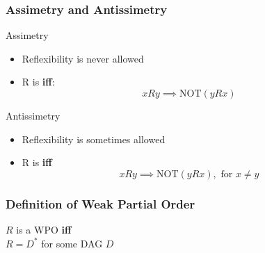 \documentclass{beamer}
\begin{document}
\begin{frame}
  \frametitle{Assimetry and Antissimetry}

  {\larger

    \begin{block}{Assimetry}
      \begin{itemize}
      \item Reflexibility is \alert{never} allowed
      \item R is  {\bf iff}:
        \begin{equation}
          xRy \implies \text{NOT}(yRx)
        \end{equation}
      \end{itemize}

    \end{block}

    \begin{block}{Antissimetry}
      \begin{itemize}
      \item Reflexibility is \alert{sometimes} allowed
      \item R is  {\bf iff}
        \begin{equation}
          xRy \implies \text{NOT}(yRx), \text{ for } x \neq y
        \end{equation}
      \end{itemize}
    \end{block}
  }
\end{frame}

\begin{frame}
  \frametitle{Definition of Weak Partial Order}

  {\huge

    $R$ is a WPO {\bf iff}\\ $R = D^*$ for some DAG $D$
  }
\end{frame}
\end{document}
